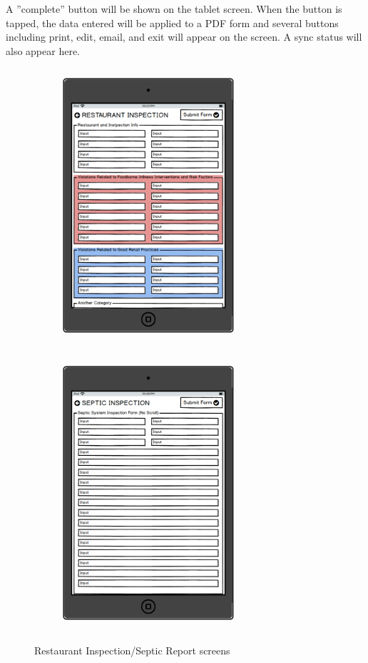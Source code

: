 \documentclass[twoside,letterpaper]{article}
\begin{document}
{\noindent A ''complete'' button will be shown on the tablet screen. When the button is tapped, the data entered will be applied to a PDF form and several buttons including print, edit, email, and exit will appear on the screen. A sync status will also appear here.

\begin{figure}
    \centering
    \begin{subfigure}[H]{0.4\textwidth}
  \includegraphics[width=2.5in,height=4in]{Restaurant_Data_Entry_Form.png}
    \end{subfigure}
    \qquad
    \begin{subfigure}[H]{0.4\textwidth}
  \includegraphics[width=2.5in,height=4in]{Septic_Data_Entry_Form.png}
    \end{subfigure}
     \caption{Restaurant Inspection/Septic Report screens}
\end{figure}

}
\end{document}
